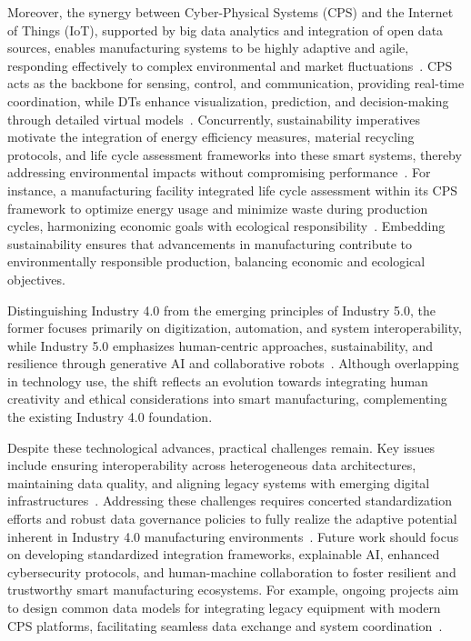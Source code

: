 \documentclass[sigconf]{acmart}
\begin{document}
Moreover, the synergy between Cyber-Physical Systems (CPS) and the Internet of Things (IoT), supported by big data analytics and integration of open data sources, enables manufacturing systems to be highly adaptive and agile, responding effectively to complex environmental and market fluctuations~\cite{ref9,ref20,ref22}. CPS acts as the backbone for sensing, control, and communication, providing real-time coordination, while DTs enhance visualization, prediction, and decision-making through detailed virtual models~\cite{ref22}. Concurrently, sustainability imperatives motivate the integration of energy efficiency measures, material recycling protocols, and life cycle assessment frameworks into these smart systems, thereby addressing environmental impacts without compromising performance~\cite{ref38,ref41}. For instance, a manufacturing facility integrated life cycle assessment within its CPS framework to optimize energy usage and minimize waste during production cycles, harmonizing economic goals with ecological responsibility~\cite{ref41}. Embedding sustainability ensures that advancements in manufacturing contribute to environmentally responsible production, balancing economic and ecological objectives.

Distinguishing Industry 4.0 from the emerging principles of Industry 5.0, the former focuses primarily on digitization, automation, and system interoperability, while Industry 5.0 emphasizes human-centric approaches, sustainability, and resilience through generative AI and collaborative robots~\cite{ref6}. Although overlapping in technology use, the shift reflects an evolution towards integrating human creativity and ethical considerations into smart manufacturing, complementing the existing Industry 4.0 foundation.

Despite these technological advances, practical challenges remain. Key issues include ensuring interoperability across heterogeneous data architectures, maintaining data quality, and aligning legacy systems with emerging digital infrastructures~\cite{ref42}. Addressing these challenges requires concerted standardization efforts and robust data governance policies to fully realize the adaptive potential inherent in Industry 4.0 manufacturing environments~\cite{ref38,ref42}. Future work should focus on developing standardized integration frameworks, explainable AI, enhanced cybersecurity protocols, and human-machine collaboration to foster resilient and trustworthy smart manufacturing ecosystems. For example, ongoing projects aim to design common data models for integrating legacy equipment with modern CPS platforms, facilitating seamless data exchange and system coordination~\cite{ref38}.
\end{document}
